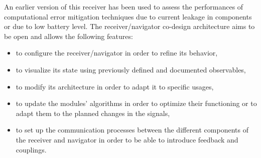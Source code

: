 \documentclass[conference]{IEEEtran}
\begin{document}
An earlier version of this receiver has been used to assess the performances of computational error mitigation techniques \cite{Haf16} due to current leakage in components or due to low battery level.
The  receiver/navigator co-design architecture aims to be open and allows the following features:
\begin{itemize}
\item to configure the receiver/navigator in order to refine its behavior,
\item to visualize its state using previously defined and documented observables,
\item to modify its architecture in order to adapt it to specific usages,
\item to update the modules' algorithms in order to optimize their functioning or to adapt them to the planned changes in the signals,
\item to set up the communication processes between the different components of the receiver and navigator in order to be able to introduce feedback and couplings.
\end{itemize}
\end{document}
